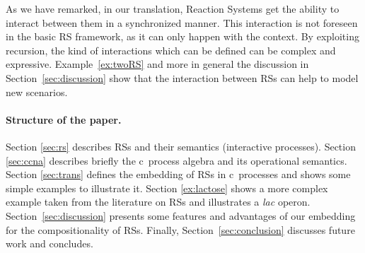 As we have remarked, in our translation, Reaction Systems 
get the ability to interact between them in a synchronized manner. 
This interaction is not foreseen in
the basic RS framework, as it can only happen with the context.
By exploiting recursion, the kind of interactions which can be 
defined can be complex and expressive.
Example~\ref{ex:twoRS} and more in general the discussion in 
Section~\ref{sec:discussion} show that 
the interaction between RSs can help to model new scenarios.

\paragraph{Structure of the paper.} Section \ref{sec:rs} 
describes RSs and their semantics (interactive processes).
Section \ref{sec:ccna} describes briefly the c\CNA \ process algebra and
its operational semantics.
Section \ref{sec:trans} defines the embedding of RSs in
c\CNA \ processes and shows some simple examples to illustrate 
it.
Section \ref{ex:lactose} shows a more complex example taken from
the literature on RSs and illustrates a \emph{lac} operon.
Section~\ref{sec:discussion} presents some features and 
advantages of our embedding for the compositionality of RSs.
Finally, Section~\ref{sec:conclusion}
discusses future work and concludes.


